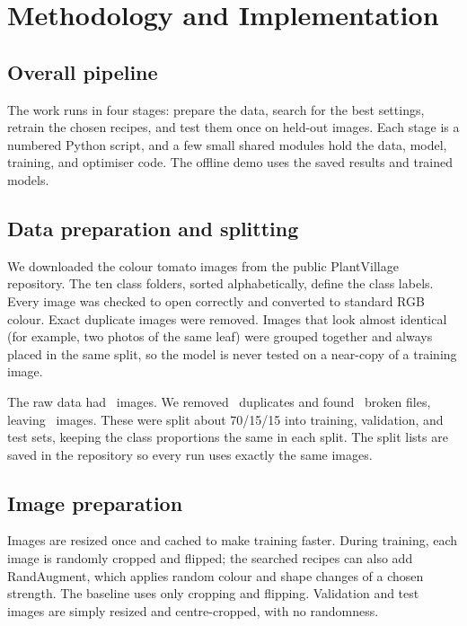 \chapter{Methodology and Implementation}
\section{Overall pipeline}
The work runs in four stages: prepare the data, search for the best settings, retrain the chosen recipes, and test them once on held-out images. Each stage is a numbered Python script, and a few small shared modules hold the data, model, training, and optimiser code. The offline demo uses the saved results and trained models.


\section{Data preparation and splitting}
We downloaded the colour tomato images from the public PlantVillage repository. The ten class folders, sorted alphabetically, define the class labels. Every image was checked to open correctly and converted to standard RGB colour. Exact duplicate images were removed. Images that look almost identical (for example, two photos of the same leaf) were grouped together and always placed in the same split, so the model is never tested on a near-copy of a training image.

The raw data had \DataOriginal\ images. We removed \DataDuplicates\ duplicates and found \DataCorrupt\ broken files, leaving \TotalN\ images. These were split about 70/15/15 into training, validation, and test sets, keeping the class proportions the same in each split. The split lists are saved in the repository so every run uses exactly the same images.


\section{Image preparation}
Images are resized once and cached to make training faster. During training, each image is randomly cropped and flipped; the searched recipes can also add RandAugment, which applies random colour and shape changes of a chosen strength. The baseline uses only cropping and flipping. Validation and test images are simply resized and centre-cropped, with no randomness.


